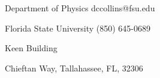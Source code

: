 
\noindent
Department of Physics 
\hfill dccollins@fsu.edu

\noindent
Florida State University \hfill   (850) 645-0689 

 Keen Building

 Chieftan Way, Tallahassee, FL, 32306 

